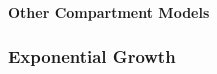 \documentclass[12pt]{article}
\newcommand{\rr}{\ensuremath{\mathcal{R}_0}}
\begin{document}



\paragraph{Other Compartment Models}


\subsubsection{Exponential Growth}

\end{document}
